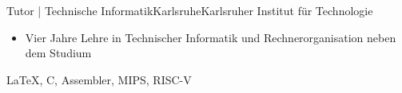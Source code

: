 {    \begin{experiences}
        \experience
        {
        }   {Tutor | Technische Informatik}{Karlsruhe}{Karlsruher Institut für Technologie}
        {
        } {
        \begin{itemize}
            \item Vier Jahre Lehre in Technischer Informatik und Rechnerorganisation neben dem Studium
        \end{itemize}
        }
        {\LaTeX, C, Assembler, MIPS, RISC-V}
        \emptySeparator
        
    \end{experiences}
}
  
